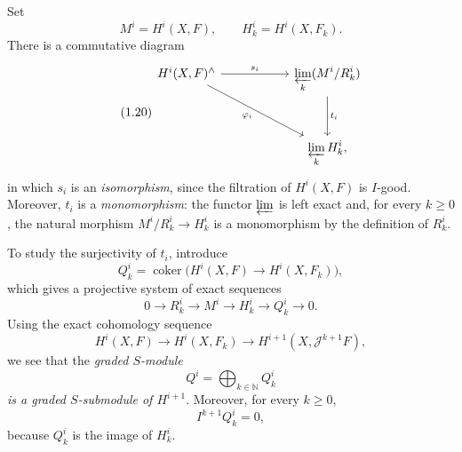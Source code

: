 Set
\begin{equation}
\tag{1.19}\label{eq:IX.1.19}
M^i=H^i(X,F),\qquad H_k^i=H^i(X,F_k).
\end{equation}
There is a commutative diagram
\begin{equation}
\tag{1.20}\label{eq:IX.1.20}
\begin{tikzcd}[column sep=5.5em,row sep=3.2em]
H^i(X,F)^{\wedge}
  \arrow[r,"s_i"]
  \arrow[dr,"\varphi_i"']
& \displaystyle\varprojlim_k(M^i/R_k^i)
  \arrow[d,"t_i"] \\
& \displaystyle\varprojlim_k H_k^i,
\end{tikzcd}
\end{equation}
in which $s_i$ is an \emph{isomorphism}, since the filtration of $H^i(X,F)$
is $I$-good. Moreover, $t_i$ is a \emph{monomorphism}: the functor
$\varprojlim$ is left exact and, for every $k\geq 0$, the natural morphism
$M^i/R_k^i\longrightarrow H_k^i$ is a monomorphism by the definition of
$R_k^i$.

To study the surjectivity of $t_i$, introduce
\begin{equation}
\tag{1.21}\label{eq:IX.1.21}
Q_k^i=\operatorname{coker}\bigl(H^i(X,F)\longrightarrow H^i(X,F_k)\bigr),
\end{equation}
which gives a projective system of exact sequences
\begin{equation}
\tag{1.22}\label{eq:IX.1.22}
0\longrightarrow R_k^i\longrightarrow M^i\longrightarrow H_k^i
 \longrightarrow Q_k^i\longrightarrow 0.
\end{equation}
Using the exact cohomology sequence
\begin{equation}
\tag{1.23}\label{eq:IX.1.23}
H^i(X,F)\longrightarrow H^i(X,F_k)
 \longrightarrow H^{i+1}(X,\mathcal J^{k+1}F),
\end{equation}
we see that the \emph{graded $S$-module}
\begin{equation}
\tag{1.24}\label{eq:IX.1.24}
Q^i=\bigoplus_{k\in\mathbb N}Q_k^i
\end{equation}
\emph{is a graded $S$-submodule of $H^{i+1}$}. Moreover, for every
$k\geq0$,
\begin{equation}
\tag{1.25}\label{eq:IX.1.25}
I^{k+1}Q_k^i=0,
\end{equation}
because $Q_k^i$ is the image of $H_k^i$.

